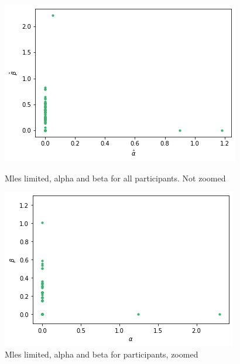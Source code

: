 \begin{figure}
    \centering
    \begin{minipage}{0.48\textwidth}
        \centering
        \includegraphics[scale=0.38]{pictures/plotted_mles_limited_alpha_beta_gk1.png}
        \caption{Mles limited, alpha and beta for all participants. Not zoomed}
        \label{fig:mles_limited_alpha_beta}
    \end{minipage}\hfill%
    \begin{minipage}{0.48\textwidth}
        \centering
        \includegraphics[scale=0.38]{pictures/plotted_mles_limited_alpha_beta_zoomed_gk1.png}
        \caption{Mles limited, alpha and beta for participants, zoomed}
        \label{fig:mles_limited_alpha_beta_zoomed}
    \end{minipage}
\end{figure}

